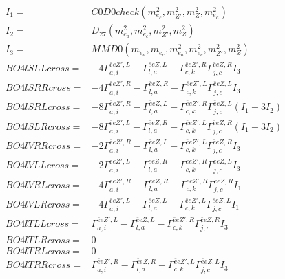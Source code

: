\documentclass[A4,landscape]{article}
\begin{document}
\begin{align} 
I_1 = & C0D0check(m^2_{e_{{c}}}, m^2_{{Z'}}, m^2_{Z}, m^2_{e_{{a}}}) \\ 
I_2 = & D_{27}(m^2_{e_{{a}}}, m^2_{e_{{c}}}, m^2_{{Z'}}, m^2_{Z}) \\ 
I_3 = & MMD0(m_{e_{{a}}}, m_{e_{{c}}}, m^2_{e_{{a}}}, m^2_{e_{{c}}}, m^2_{{Z'}}, m^2_{Z}) \\ 
  BO4lSLLcross= & -4  \Gamma^{\bar{e}e {Z'} ,L}_{a, i} - \Gamma^{\bar{e}e Z ,L} _{l, a} - \Gamma^{\bar{e}e {Z'} ,R} _{c, k} \Gamma^{\bar{e}e Z ,R}_{j, c} I_3 \\ 
  BO4lSRRcross= & -4  \Gamma^{\bar{e}e {Z'} ,R}_{a, i} - \Gamma^{\bar{e}e Z ,R} _{l, a} - \Gamma^{\bar{e}e {Z'} ,L} _{c, k} \Gamma^{\bar{e}e Z ,L}_{j, c} I_3 \\ 
  BO4lSRLcross= & -8  \Gamma^{\bar{e}e {Z'} ,R}_{a, i} - \Gamma^{\bar{e}e Z ,L} _{l, a} - \Gamma^{\bar{e}e {Z'} ,R} _{c, k} \Gamma^{\bar{e}e Z ,L}_{j, c} (I_1 - 3 I_2) \\ 
  BO4lSLRcross= & -8  \Gamma^{\bar{e}e {Z'} ,L}_{a, i} - \Gamma^{\bar{e}e Z ,R} _{l, a} - \Gamma^{\bar{e}e {Z'} ,L} _{c, k} \Gamma^{\bar{e}e Z ,R}_{j, c} (I_1 - 3 I_2) \\ 
  BO4lVRRcross= & -2  \Gamma^{\bar{e}e {Z'} ,R}_{a, i} - \Gamma^{\bar{e}e Z ,L} _{l, a} - \Gamma^{\bar{e}e {Z'} ,L} _{c, k} \Gamma^{\bar{e}e Z ,R}_{j, c} I_3 \\ 
  BO4lVLLcross= & -2  \Gamma^{\bar{e}e {Z'} ,L}_{a, i} - \Gamma^{\bar{e}e Z ,R} _{l, a} - \Gamma^{\bar{e}e {Z'} ,R} _{c, k} \Gamma^{\bar{e}e Z ,L}_{j, c} I_3 \\ 
  BO4lVRLcross= & -4  \Gamma^{\bar{e}e {Z'} ,R}_{a, i} - \Gamma^{\bar{e}e Z ,R} _{l, a} - \Gamma^{\bar{e}e {Z'} ,R} _{c, k} \Gamma^{\bar{e}e Z ,R}_{j, c} I_1 \\ 
  BO4lVLRcross= & -4  \Gamma^{\bar{e}e {Z'} ,L}_{a, i} - \Gamma^{\bar{e}e Z ,L} _{l, a} - \Gamma^{\bar{e}e {Z'} ,L} _{c, k} \Gamma^{\bar{e}e Z ,L}_{j, c} I_1 \\ 
  BO4lTLLcross= &  \Gamma^{\bar{e}e {Z'} ,L}_{a, i} - \Gamma^{\bar{e}e Z ,L} _{l, a} - \Gamma^{\bar{e}e {Z'} ,R} _{c, k} \Gamma^{\bar{e}e Z ,R}_{j, c} I_3 \\ 
  BO4lTLRcross= & 0 \\ 
  BO4lTRLcross= & 0 \\ 
  BO4lTRRcross= &  \Gamma^{\bar{e}e {Z'} ,R}_{a, i} - \Gamma^{\bar{e}e Z ,R} _{l, a} - \Gamma^{\bar{e}e {Z'} ,L} _{c, k} \Gamma^{\bar{e}e Z ,L}_{j, c} I_3 \\ 
\end{align} 
\end{document}
